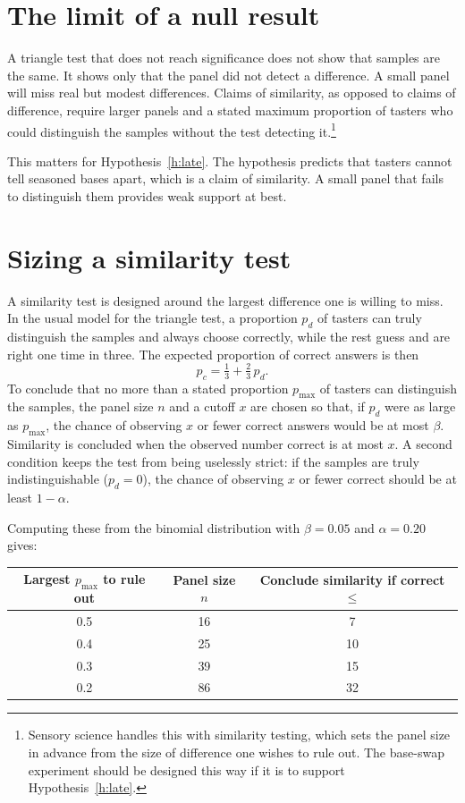\documentclass[11pt,openany]{book}
\theoremstyle{definition}
\begin{document}
\section{The limit of a null result}

A triangle test that does not reach significance does not show that samples are the same. It shows only that the panel did not detect a difference. A small panel will miss real but modest differences. Claims of similarity, as opposed to claims of difference, require larger panels and a stated maximum proportion of tasters who could distinguish the samples without the test detecting it.\footnote{Sensory science handles this with similarity testing, which sets the panel size in advance from the size of difference one wishes to rule out. The base-swap experiment should be designed this way if it is to support Hypothesis~\ref{h:late}.}

This matters for Hypothesis~\ref{h:late}. The hypothesis predicts that tasters cannot tell seasoned bases apart, which is a claim of similarity. A small panel that fails to distinguish them provides weak support at best.

\section{Sizing a similarity test}\label{sec:similarity}

A similarity test is designed around the largest difference one is willing to miss. In the usual model for the triangle test, a proportion $p_d$ of tasters can truly distinguish the samples and always choose correctly, while the rest guess and are right one time in three. The expected proportion of correct answers is then
\[
p_c = \tfrac{1}{3} + \tfrac{2}{3}\,p_d .
\]
To conclude that no more than a stated proportion $p_{\max}$ of tasters can distinguish the samples, the panel size $n$ and a cutoff $x$ are chosen so that, if $p_d$ were as large as $p_{\max}$, the chance of observing $x$ or fewer correct answers would be at most $\beta$. Similarity is concluded when the observed number correct is at most $x$. A second condition keeps the test from being uselessly strict: if the samples are truly indistinguishable ($p_d = 0$), the chance of observing $x$ or fewer correct should be at least $1-\alpha$.

Computing these from the binomial distribution with $\beta = 0.05$ and $\alpha = 0.20$ gives:

\begin{center}
\begin{tabular}{@{}ccc@{}}
\toprule
Largest $p_{\max}$ to rule out & Panel size $n$ & Conclude similarity if correct $\leq$ \\
\midrule
0.5 & 16 & 7 \\
0.4 & 25 & 10 \\
0.3 & 39 & 15 \\
0.2 & 86 & 32 \\
\bottomrule
\end{tabular}
\end{center}
\end{document}
